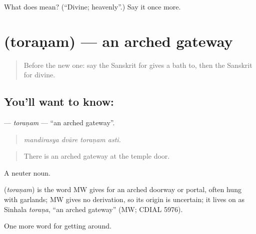 \begin{tcolorbox}[breakable,colback=teal!4,colframe=teal!35!black,title={Before you move on}]
What does  mean? (\textquotedblleft{}Divine; heavenly\textquotedblright{}.) Say it once more.
\end{tcolorbox}
\section[\texorpdfstring{\sk{तोरणम्} (toraṇam)}{तोरणम् (toraṇam)}]{ (toraṇam) — an arched gateway}

\label{lesson:SA-C399-toranam}



\begin{quote}
Before the new one: say the Sanskrit for gives a bath to, then the Sanskrit for divine.
\end{quote}

\subsection*{You'll want to know: }
\textbf{} — \emph{toraṇam} — \textquotedblleft{}an arched gateway\textquotedblright{}.

\begin{quote}
   
\end{quote}

\begin{quote}
\emph{mandirasya dvāre toraṇam asti.}
\end{quote}

\begin{quote}
There is an arched gateway at the temple door.
\end{quote}

A neuter noun.

\begin{cousinweb}
\textbf{} (\emph{toraṇam}) is the word MW gives for an arched doorway or portal, often hung with garlands; MW gives no derivation, so its origin is uncertain; it lives on as Sinhala \emph{toraṇa}, \textquotedblleft{}an arched gateway\textquotedblright{} (MW; CDIAL 5976).
\end{cousinweb}

\begin{grammarlens}[title={What you've built}]
One more word for getting around.
\end{grammarlens}


